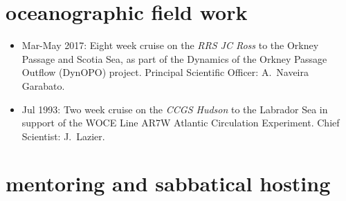 \documentclass{article}
\begin{document}
\section*{\sc \color{Maroon}  oceanographic field work}
\vspace{-.25cm}

\begin{itemize}[leftmargin=*]
 \item 
 Mar-May 2017: Eight week cruise on the {\it RRS JC Ross}  to the Orkney Passage and Scotia Sea,
  as part of the
  Dynamics of the Orkney Passage Outflow (DynOPO) project. Principal Scientific Officer: A.\ Naveira Garabato. 
 \item 
  Jul 1993: Two week cruise on the {\it CCGS Hudson} to the Labrador Sea in support of  the WOCE Line AR7W Atlantic Circulation Experiment. Chief Scientist: J.\ Lazier.
\end{itemize}



\section*{\sc  \color{Maroon} mentoring and sabbatical hosting}
\vspace{-.25cm}
\end{document}
